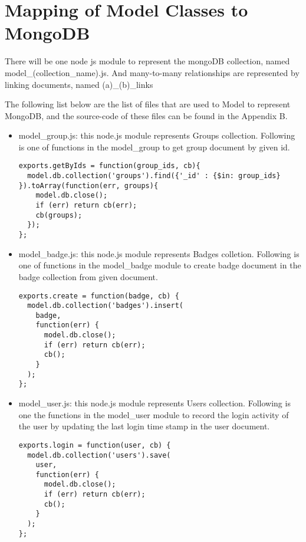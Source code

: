 \section{Mapping of Model Classes to MongoDB}
There will be one node js module to represent the mongoDB collection, named model{\_}(collection{\_}name).js. And many-to-many relationships are represented by linking documents, named (a){\_}(b){\_}links

The following list below are the list of files that are used to Model to represent MongoDB, and the source-code of these files can be found in the Appendix B.

\begin{itemize}
\item model{\_}group.js: this node.js module represents Groups collection. Following is one of functions in the model{\_}group to get group document by given id. 

\begin{lstlisting}
exports.getByIds = function(group_ids, cb){
  model.db.collection('groups').find({'_id' : {$in: group_ids} }).toArray(function(err, groups){
    model.db.close();
    if (err) return cb(err);
    cb(groups);
  });
};
\end{lstlisting}

\item model{\_}badge.js: this node.js module represents Badges colletion. Following is one of functions in the model{\_}badge module to create badge document in the badge collection from given document.  

\begin{lstlisting}
exports.create = function(badge, cb) {
  model.db.collection('badges').insert(
    badge,
    function(err) {
      model.db.close();
      if (err) return cb(err); 
      cb();
    }
  );  
};
\end{lstlisting}

\item model{\_}user.js: this node.js module represents Users collection. Following is one the functions in the model{\_}user module to record the login activity of the user by updating the last login time stamp in the user document.

\begin{lstlisting}
exports.login = function(user, cb) {
  model.db.collection('users').save(
    user,
    function(err) {
      model.db.close();
      if (err) return cb(err); 
      cb();
    }
  ); 
};
\end{lstlisting}


\end{itemize}
